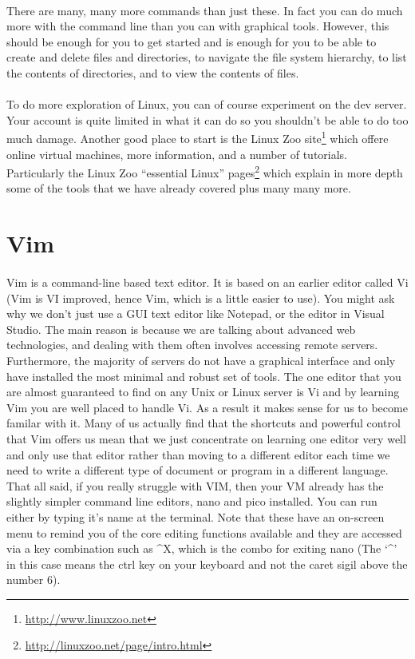 \documentclass[12pt, a4paper, oneside]{book}
\begin{document}
\paragraph{} There are many, many more commands than just these. In fact you can do much more with the command line than you can with graphical tools. However, this should be enough for you to get started and is enough for you to be able to create and delete files and directories, to navigate the file system hierarchy, to list the contents of directories, and to view the contents of files. 

\paragraph{} To do more exploration of Linux, you can of course experiment on the dev server. Your account is quite limited in what it can do so you shouldn't be able to do too much damage. Another good place to start is the Linux Zoo site\footnote{\url{http://www.linuxzoo.net}} which offere online virtual machines, more information, and a number of tutorials. Particularly the Linux Zoo ``essential Linux'' pages\footnote{\url{http://linuxzoo.net/page/intro.html}} which explain in more depth some of the tools that we have already covered plus many many more.




\section{Vim}
\label{vim}
\paragraph{} Vim is a command-line based text editor. It is based on an earlier editor called Vi (Vim is VI improved, hence Vim, which is a little easier to use). You might ask why we don't just use a GUI text editor like Notepad, or the editor in Visual Studio. The main reason is because we are talking about advanced web technologies, and dealing with them often involves accessing remote servers. Furthermore, the majority of servers do not have a graphical interface and only have installed the most minimal and robust set of tools. The one editor that you are almost guaranteed to find on any Unix or Linux server is Vi and by learning Vim you are well placed to handle Vi. As a result it makes sense for us to become familar with it. Many of us actually find that the shortcuts and powerful control that Vim offers us mean that we just concentrate on learning one editor very well and only use that editor rather than moving to a different editor each time we need to write a different type of document or program in a different language. That all said, if you really struggle with VIM, then your VM already has the slightly simpler command line editors, nano and pico installed. You can run either by typing it's name at the terminal. Note that these have an on-screen menu to remind you of the core editing functions available and they are accessed via a key combination such as \string^X, which is the combo for exiting nano (The `\string^' in this case means the ctrl key on your keyboard and not the caret sigil above the number 6).
\end{document}
